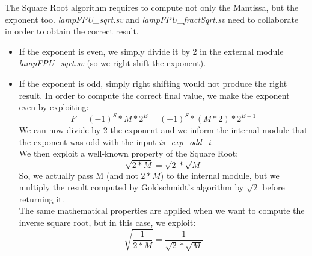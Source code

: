 The Square Root algorithm requires to compute not only the Mantissa, but the exponent too. \emph{lampFPU\_sqrt.sv} and  \emph{lampFPU\_fractSqrt.sv} need to collaborate in order to obtain the correct result. 
\begin{itemize}
\item If the exponent is even, we simply divide it by 2 in the external module \emph{lampFPU\_sqrt.sv}  (so we right shift the exponent).
\item If the exponent is odd, simply right shifting would not produce the right result. In order to compute the correct final value, we make the exponent even by exploiting:
$$F = (-1)^{S}*M*2^{E}  = (-1)^{S}*(M*2)*2^{E-1} $$
We can now divide by 2 the exponent and we inform the internal module that the exponent was odd with the input \emph{is\_exp\_odd\_i}. \\
We then exploit a well-known property of the Square Root:
$$ \sqrt{2*M} = \sqrt{2} * \sqrt{M} $$
So, we actually pass M (and not $2 * M$) to the internal module, but we multiply the result computed by Goldschmidt's algorithm by $\sqrt{2}$ before returning it.\\
The same mathematical properties are applied when we want to compute the inverse square root, but in this case, we exploit:
$$ \sqrt{\frac{1}{2*M}} = \frac{1}{\sqrt{2} * \sqrt{M}} $$
\end{itemize} 

